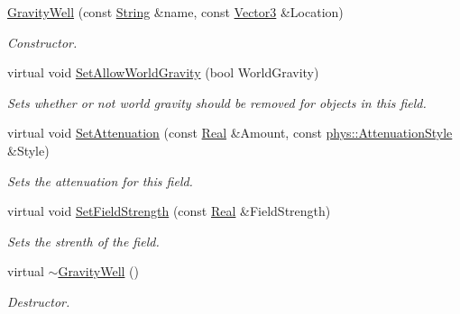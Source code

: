 \begin{DoxyCompactItemize}
\hyperlink{classphys_1_1GravityWell_a628f12b77e5a83a20a51a921d1972e03}{GravityWell} (const \hyperlink{namespacephys_aa03900411993de7fbfec4789bc1d392e}{String} \&name, const \hyperlink{classphys_1_1Vector3}{Vector3} \&Location)
\begin{DoxyCompactList}\small\item\em Constructor. \item\end{DoxyCompactList}\item 
virtual void \hyperlink{classphys_1_1GravityWell_a1dc68391835134835a9969ed823a0b81}{SetAllowWorldGravity} (bool WorldGravity)
\begin{DoxyCompactList}\small\item\em Sets whether or not world gravity should be removed for objects in this field. \item\end{DoxyCompactList}\item 
virtual void \hyperlink{classphys_1_1GravityWell_a0d3b34c032e1f0af0ddc1293364d3001}{SetAttenuation} (const \hyperlink{namespacephys_af7eb897198d265b8e868f45240230d5f}{Real} \&Amount, const \hyperlink{namespacephys_ad4ce7ee5c1cc164f2ea3d5f28211739f}{phys::AttenuationStyle} \&Style)
\begin{DoxyCompactList}\small\item\em Sets the attenuation for this field. \item\end{DoxyCompactList}\item 
virtual void \hyperlink{classphys_1_1GravityWell_a2e08c34a70bc57560d77702c40dd8021}{SetFieldStrength} (const \hyperlink{namespacephys_af7eb897198d265b8e868f45240230d5f}{Real} \&FieldStrength)
\begin{DoxyCompactList}\small\item\em Sets the strenth of the field. \item\end{DoxyCompactList}\item 
virtual \hyperlink{classphys_1_1GravityWell_aeeeb63ceb3feb1223f8339f73412777d}{$\sim$GravityWell} ()
\begin{DoxyCompactList}\small\item\em Destructor. \item\end{DoxyCompactList}\end{DoxyCompactItemize}
